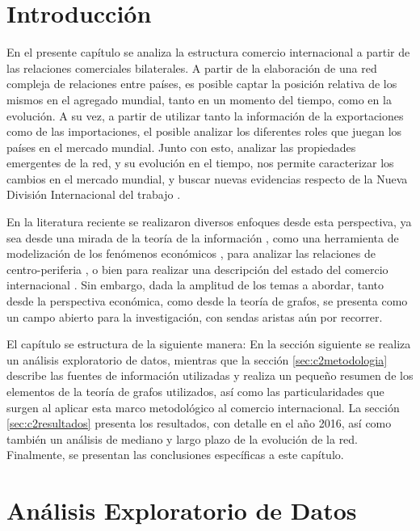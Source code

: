 \documentclass[class=article, crop=false]{standalone}
\begin{document}
\section{Introducción}

En el presente capítulo se analiza la estructura comercio internacional a partir de las relaciones comerciales bilaterales. A partir de la elaboración de una red compleja de relaciones entre países, es posible captar la posición relativa de los mismos en el agregado mundial, tanto en un momento del tiempo, como en la evolución. A su vez, a partir de utilizar tanto la información de la exportaciones como de las importaciones, el posible analizar los diferentes roles que juegan los países en el mercado mundial. Junto con esto, analizar las propiedades emergentes de la red, y su evolución en el tiempo, nos permite caracterizar los cambios en el mercado mundial, y buscar nuevas evidencias respecto de la Nueva División Internacional del trabajo \citep{frobel1978new}.

En la literatura reciente se realizaron diversos enfoques desde esta perspectiva, ya sea desde una mirada de la teoría de la información \citep{Bhattacharya2008},  como una herramienta de modelización de los fenómenos económicos \citep{Fan2014}, para analizar las relaciones de centro-periferia \citep{Fagiolo2010}, o bien para realizar una descripción del estado del comercio internacional \citep{Chow2013}. Sin embargo, dada la amplitud de los temas a abordar, tanto desde la perspectiva económica, como desde la teoría de grafos, se presenta como un campo abierto para la investigación, con sendas aristas aún por recorrer.        

El capítulo se estructura de la siguiente manera: En la sección siguiente se realiza un análisis exploratorio de datos, mientras que la sección \ref{sec:c2metodologia} describe las fuentes de información utilizadas y realiza un pequeño resumen de los elementos de la teoría de grafos utilizados, así como las particularidades que surgen al aplicar esta marco metodológico al comercio internacional. La sección \ref{sec:c2resultados} presenta los resultados, con detalle en el año 2016, así como también un análisis de mediano y largo plazo de la evolución de la red. Finalmente, se presentan las conclusiones específicas a este capítulo.


\section{Análisis Exploratorio de Datos}
\end{document}
